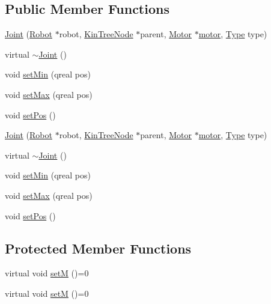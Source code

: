 \subsection*{Public Member Functions}
\begin{DoxyCompactItemize}
\item 
\hyperlink{class_robot_model_1_1_joint_ac0077acd1f45742c84c3468cce889600}{Joint} (\hyperlink{class_robot_model_1_1_robot}{Robot} $\ast$robot, \hyperlink{class_robot_model_1_1_kin_tree_node}{KinTreeNode} $\ast$parent, \hyperlink{class_robot_model_1_1_motor}{Motor} $\ast$\hyperlink{class_robot_model_1_1_joint_a8e8165df2271b16ab446028ee6bfa1c6}{motor}, \hyperlink{class_robot_model_1_1_kin_tree_node_a6cc10fb82046bd1d9f61b806756ad176}{Type} type)
\item 
virtual \hyperlink{class_robot_model_1_1_joint_a42aca0bd1832136984923713127c28f1}{$\sim$Joint} ()
\item 
void \hyperlink{class_robot_model_1_1_joint_ad982580bf8c0d721babaf93d990cf5d7}{setMin} (qreal pos)
\item 
void \hyperlink{class_robot_model_1_1_joint_a48523fd1cf98af4b0856257cde75f486}{setMax} (qreal pos)
\item 
void \hyperlink{class_robot_model_1_1_joint_a4fc5a8c53c2a2c5839409d90fb0825e1}{setPos} ()
\item 
\hyperlink{class_robot_model_1_1_joint_ace81033ec821f5bcb7e15c5ac1a84946}{Joint} (\hyperlink{class_robot_model_1_1_robot}{Robot} $\ast$robot, \hyperlink{class_robot_model_1_1_kin_tree_node}{KinTreeNode} $\ast$parent, \hyperlink{class_robot_model_1_1_motor}{Motor} $\ast$\hyperlink{class_robot_model_1_1_joint_a8e8165df2271b16ab446028ee6bfa1c6}{motor}, \hyperlink{class_robot_model_1_1_kin_tree_node_a6cc10fb82046bd1d9f61b806756ad176}{Type} type)
\item 
virtual \hyperlink{class_robot_model_1_1_joint_a191470d2376b08f2f3debc15d5e89ad0}{$\sim$Joint} ()
\item 
void \hyperlink{class_robot_model_1_1_joint_ad982580bf8c0d721babaf93d990cf5d7}{setMin} (qreal pos)
\item 
void \hyperlink{class_robot_model_1_1_joint_a48523fd1cf98af4b0856257cde75f486}{setMax} (qreal pos)
\item 
void \hyperlink{class_robot_model_1_1_joint_a816fef4ec39f5a4239540ba5a7011d6a}{setPos} ()
\end{DoxyCompactItemize}
\subsection*{Protected Member Functions}
\begin{DoxyCompactItemize}
\item 
virtual void \hyperlink{class_robot_model_1_1_joint_a485f5fc46f5156a7383bee7edbfc6643}{setM} ()=0
\item 
virtual void \hyperlink{class_robot_model_1_1_joint_a485f5fc46f5156a7383bee7edbfc6643}{setM} ()=0
\end{DoxyCompactItemize}
